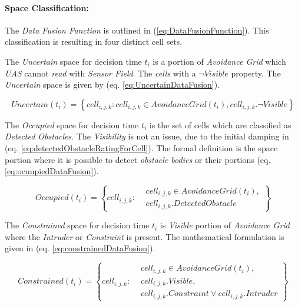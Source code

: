 \paragraph{Space Classification:} The \emph{Data Fusion Function} is outlined in (\ref{eq:DataFusionFunction}). This classification is resulting in four distinct cell sets.

The \emph{Uncertain} space for decision time $t_i$ is a portion of \emph{Avoidance Grid} which \emph{UAS} cannot \emph{read} with \emph{Sensor Field}. The \emph{cells} with a $\neg Visible$ property. The \emph{Uncertain} space is given by (eq. \ref{eq:UncertainDataFusion}).

\begin{equation}\label{eq:UncertainDataFusion}
    Uncertain(t_i) = \left\{cell_{i,j,k}:cell_{i,j,k}\in AvoidanceGrid(t_i),cell_{i,j,k}.\neg Visible \right\}
\end{equation}

\noindent The \emph{Occupied} space for decision time $t_i$ is the set of cells which are classified as \emph{Detected Obstacles}. The \emph{Visibility} is not an issue, due to the initial damping in (eq. \ref{eq:detectedObstacleRatingForCell}). The formal definition is the space portion where it is possible to detect \emph{obstacle bodies} or their portions (eq. \ref{eq:ocuupiedDataFusion}).

\begin{equation}\label{eq:ocuupiedDataFusion}
    Occupied(t_i) = \left\{cell_{i,j,k}:\begin{aligned}&cell_{i,j,k}\in AvoidanceGrid(t_i),\\&cell_{i,j,k}.DetectedObstacle\end{aligned}\right\}
\end{equation}

\noindent The \emph{Constrained} space for decision time $t_i$ is \emph{Visible} portion of \emph{Avoidance Grid} where the \emph{Intruder} or \emph{Constraint} is present. The mathematical formulation is given in (eq. \ref{eq:constrainedDataFusion}).

\begin{equation}\label{eq:constrainedDataFusion}
    Constrained(t_i) = \left\{cell_{i,j,k}:
    \begin{aligned}
        &cell_{i,j,k} \in AvoidanceGrid(t_i),\\
        &cell_{i,j,k}.Visible,\\
        &cell_{i,j,k}.Constraint \vee cell_{i,j,k}.Intruder
    \end{aligned}\right\}
\end{equation}

